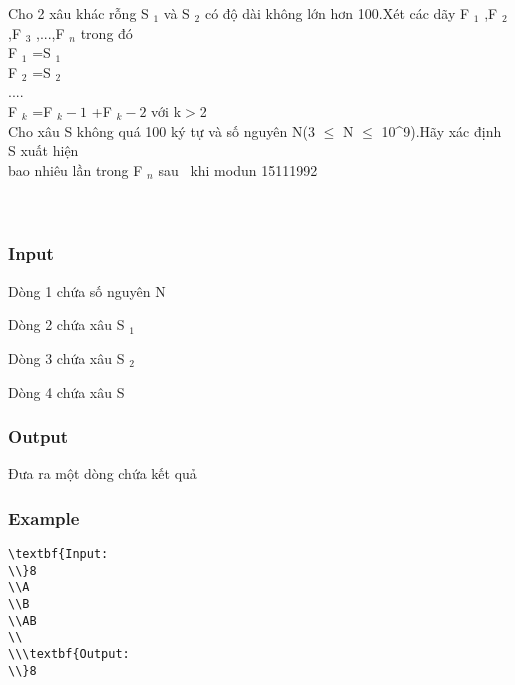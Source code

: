 



   Cho 2 xâu khác rỗng S   $_    1   $   và S   $_    2   $   có độ dài không lớn hơn 100.Xét các dãy F   $_    1   $   ,F   $_    2   $   ,F   $_    3   $   ,...,F   $_    n   $   trong đó   
\\   F   $_    1   $   =S   $_    1   $
\\   F   $_    2   $   =S   $_    2   $
\\   ....   
\\   F   $_    k   $   =F   $_    k-1   $   +F   $_    k-2   $   với k$>$2   
\\   Cho xâu S không quá 100 ký tự và số nguyên N(3 $\le$ N $\le$ 10\textasciicircum9).Hãy xác định S xuất hiện   
\\   bao nhiêu lần trong F   $_    n   $   sau  khi modun 15111992   
\\
\\
\\

\subsubsection{   Input  }

   Dòng 1 chứa số nguyên N  

   Dòng 2 chứa xâu S   $_    1   $

   Dòng 3 chứa xâu S   $_    2   $

   Dòng 4 chứa xâu S  

\subsubsection{   Output  }

   Đưa ra một dòng chứa kết quả  

\subsubsection{   Example  }
\begin{verbatim}
\textbf{Input:
\\}8
\\A
\\B
\\AB
\\
\\\textbf{Output:
\\}8 \end{verbatim}
